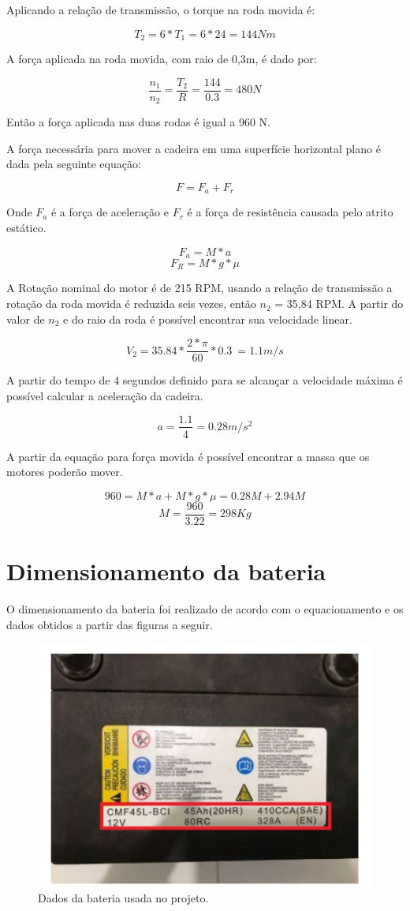 Aplicando a relação de transmissão, o torque na roda movida é:

\[T_2 = 6* T_1  = 6*24 = 144 Nm\]

A força aplicada na roda movida, com raio de 0,3m, é dado por:

\[\frac{n_1}{n_2} = \frac{T_2}{R} = \frac{144}{0.3} = 480 N\]

Então a força aplicada nas duas rodas é igual a 960 N.

A força necessária para mover a cadeira em uma superfície horizontal plano é dada pela seguinte equação:

\[F = F_a + F_r\]

Onde \(F_a\) é a força de aceleração e \(F_r\)  é a força de resistência causada pelo atrito estático.

\[F_a = M*a\]
\[F_R = M*g*\mu\]

A Rotação nominal do motor é de 215 RPM, usando a relação de transmissão a rotação da roda movida é reduzida seis vezes, então \(n_2\) = 35,84 RPM. A partir do valor de \(n_2\) e do raio da roda é possível encontrar sua velocidade linear.

\[V_2 = 35.84 * \frac{2*\pi}{60}*0.3\ = 1.1 m/s\] 

A partir do tempo de 4 segundos definido para se alcançar a velocidade máxima é possível calcular a aceleração da cadeira.

\[a = \frac{1.1}{4} = 0.28 m/s^2\]

A partir da equação para força movida é possível encontrar a massa que os motores poderão mover.

\[960 = M*a + M*g*\mu = 0.28M + 2.94M\]
\[M = \frac{960}{3.22} = 298 Kg\]

\section{Dimensionamento da bateria}

O dimensionamento da bateria foi realizado de acordo com o equacionamento e
os dados obtidos a partir das figuras a seguir.

\begin{figure}[h!]
  \centering
  \includegraphics{figuras/Bateria1.jpg}
  \caption{Dados da bateria usada no projeto.}
\end{figure}

